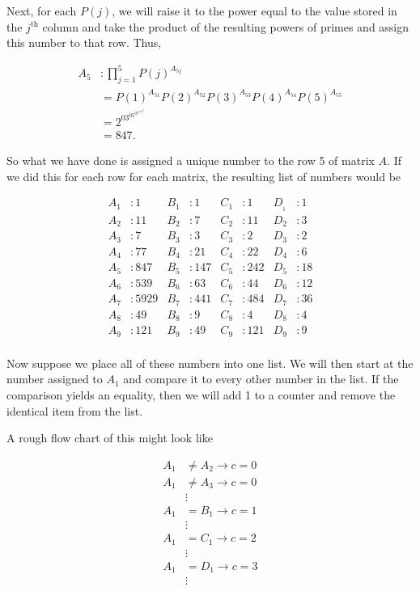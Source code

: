 \documentclass[12pt, a4paper]{article}
\begin{document}
Next, for each $P(j)$, we will raise it to the power equal to the value stored in the $j^{\text{th}}$ column and take the product of the resulting powers of primes and assign this number to that row. Thus,

\begin{equation*}
    \begin{split}
        A_5 &: \prod\limits_{j=1}^{5}P(j)^{A_{5j}} \\
        &= P(1)^{A_{51}}P(2)^{A_{52}}P(3)^{A_{53}}P(4)^{A_{54}}P(5)^{A_{55}} \\
        &= 2^03^05^07^111^2 \\
        &=847.
    \end{split}
\end{equation*}

\noindent So what we have done is assigned a unique number to the row 5 of matrix $A$. If we did this for each row for each matrix, the resulting list of numbers would be

\begin{align*}
        A_1 & : 1 & B_1 & : 1 & C_1 & : 1 & D__1 & : 1 \\
        A_2 & : 11 & B_2 & : 7 & C_2 & : 11 & D_2 & : 3\\ 
        A_3 & : 7 & B_3 & : 3 & C_3 & : 2& D_3 & : 2\\ 
        A_4 & : 77 & B_4 & : 21 & C_4 & : 22& D_4 & : 6\\
        A_5 & : 847 & B_5 & : 147& C_5 & : 242& D_5 & : 18\\ 
        A_6 & : 539& B_6 & : 63& C_6 & : 44& D_6 & : 12\\ 
        A_7 & : 5929& B_7 & :441 & C_7 & : 484& D_7 & : 36 \\ 
        A_8 & : 49& B_8 & : 9 & C_8 & : 4& D_8 & : 4 \\ 
        A_9 & : 121& B_9 & : 49 & C_9 & :121 & D_9 & : 9 \\ 
\end{align*}

\noindent Now suppose we place all of these numbers into one list. We will then start at the number assigned to $A_1$ and compare it to every other number in the list. If the comparison yields an equality, then we will add 1 to a counter and remove the identical item from the list.\par A rough flow chart of this might look like

\begin{equation*}
    \begin{split}
        A_1 &\neq A_2 \rightarrow c = 0 \\
        A_1 &\neq A_3 \rightarrow c = 0 \\
        &\vdots \\
        A_1 &= B_1\rightarrow c = 1 \\
        &\vdots \\
        A_1 &= C_1\rightarrow c=2 \\
        &\vdots \\
        A_1 &= D_1\rightarrow c = 3 \\
        &\vdots
    \end{split}
\end{equation*}
\end{document}
